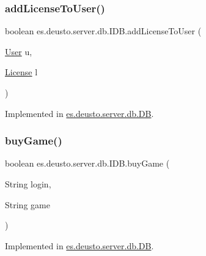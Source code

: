 \subsubsection{\texorpdfstring{add\+License\+To\+User()}{addLicenseToUser()}}
{\footnotesize\ttfamily boolean es.\+deusto.\+server.\+db.\+I\+D\+B.\+add\+License\+To\+User (\begin{DoxyParamCaption}\item[{\hyperlink{classes_1_1deusto_1_1server_1_1db_1_1data_1_1_user}{User}}]{u,  }\item[{\hyperlink{classes_1_1deusto_1_1server_1_1db_1_1data_1_1_license}{License}}]{l }\end{DoxyParamCaption})}



Implemented in \hyperlink{classes_1_1deusto_1_1server_1_1db_1_1_d_b_a996d40d6b184ea0dfa3dcab05bc04757}{es.\+deusto.\+server.\+db.\+DB}.

\mbox{\label{interfacees_1_1deusto_1_1server_1_1db_1_1_i_d_b_ab1076d02bd6b4da29d0e99e1310048b6}} 
\subsubsection{\texorpdfstring{buy\+Game()}{buyGame()}}
{\footnotesize\ttfamily boolean es.\+deusto.\+server.\+db.\+I\+D\+B.\+buy\+Game (\begin{DoxyParamCaption}\item[{String}]{login,  }\item[{String}]{game }\end{DoxyParamCaption})}



Implemented in \hyperlink{classes_1_1deusto_1_1server_1_1db_1_1_d_b_a8aa2e7531181a31b54850ca6665f87c2}{es.\+deusto.\+server.\+db.\+DB}.

\mbox{\label{interfacees_1_1deusto_1_1server_1_1db_1_1_i_d_b_a76af81d4bb71c81490da92d67c5b6d03}} 
